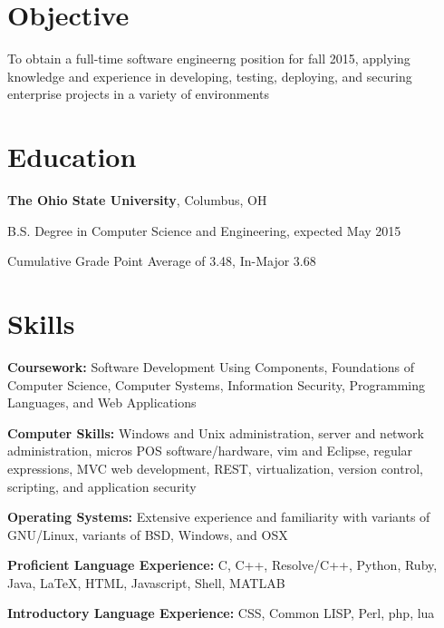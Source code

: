 \documentclass[letterpaper]{resume}
\begin{document}
\author{Christopher John Wallace}
\maketitle

\section{Objective}
\begin{compactitem}
\item
	To obtain a full-time software engineerng position for fall 2015, applying
	knowledge and experience in developing, testing, deploying, and securing
	enterprise projects in a variety of environments
\end{compactitem}

\section{Education}
\textbf{The Ohio State University}, Columbus, OH

\begin{compactitem}
\item B.S. Degree in Computer Science and Engineering, expected May 2015
\item Cumulative Grade Point Average of 3.48, In-Major 3.68
\end{compactitem}

\section{Skills}

\begin{compactitem}
\item
	\textbf{Coursework:}
	Software Development Using Components, Foundations of Computer Science,
	Computer Systems, Information Security, Programming Languages,
	and Web Applications

\item
	\textbf{Computer Skills:}
	Windows and Unix administration, server and network
	administration, micros POS software/hardware, vim and Eclipse,
	regular expressions, MVC web development, REST, virtualization, version
	control, scripting, and application security

\item
	\textbf{Operating Systems:}
	Extensive experience and familiarity with variants of GNU/Linux, variants
	of BSD, Windows, and OSX

\item
	\textbf{Proficient Language Experience:}
	C, C++, Resolve/C++, Python, Ruby, Java, \LaTeX, HTML, Javascript, Shell,
	MATLAB
\item
	\textbf{Introductory Language Experience:}
	CSS, Common LISP, Perl, php, lua

\end{compactitem}
\end{document}
